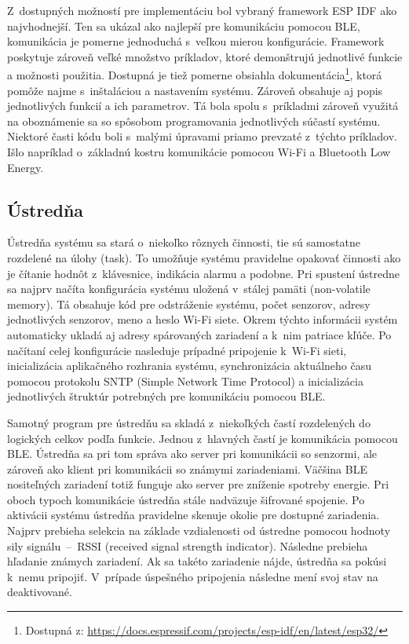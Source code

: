 Z~dostupných možností pre implementáciu bol vybraný framework ESP IDF ako najvhodnejší. Ten sa ukázal ako najlepší pre komunikáciu pomocou BLE, komunikácia je pomerne jednoduchá s~veľkou mierou konfigurácie. Framework poskytuje zároveň veľké množstvo príkladov, ktoré demonštrujú jednotlivé funkcie a možnosti použitia. Dostupná je tiež pomerne obsiahla dokumentácia\footnote{Dostupná z: \url{https://docs.espressif.com/projects/esp-idf/en/latest/esp32/}}, ktorá pomôže najme s~inštaláciou a nastavením systému. Zároveň obsahuje aj popis jednotlivých funkcií a ich parametrov. Tá bola spolu s~príkladmi zároveň využitá na oboznámenie sa so spôsobom programovania jednotlivých súčastí systému. Niektoré časti kódu boli s~malými úpravami priamo prevzaté z~týchto príkladov. Išlo napríklad o~základnú kostru komunikácie pomocou Wi-Fi a Bluetooth Low Energy.

\subsection{Ústredňa}

Ústredňa systému sa stará o~niekoľko rôznych činnosti, tie sú samostatne rozdelené na úlohy (task). To umožňuje systému pravidelne opakovať činnosti ako je čítanie hodnôt z~klávesnice, indikácia alarmu a podobne. Pri spustení ústredne sa najprv načíta konfigurácia systému uložená v~stálej pamäti (non-volatile memory). Tá obsahuje kód pre odstráženie systému, počet senzorov, adresy jednotlivých senzorov, meno a heslo Wi-Fi siete. Okrem týchto informácii systém automaticky ukladá aj adresy spárovaných zariadení a k~nim patriace kľúče. Po načítaní celej konfigurácie nasleduje prípadné pripojenie k~Wi-Fi sieti, inicializácia aplikačného rozhrania systému, synchronizácia aktuálneho času pomocou protokolu SNTP (Simple Network Time Protocol) a inicializácia jednotlivých štruktúr potrebných pre komunikáciu pomocou BLE. 

Samotný program pre ústredňu sa skladá z~niekoľkých častí rozdelených do logických celkov podľa funkcie. Jednou z~hlavných častí je komunikácia pomocou BLE. Ústredňa sa pri tom správa ako server pri komunikácii so senzormi, ale zároveň ako klient pri komunikácii so známymi zariadeniami. Väčšina BLE nositeľných zariadení totiž funguje ako server pre zníženie spotreby energie. Pri oboch typoch komunikácie ústredňa stále nadväzuje šifrované spojenie. Po aktivácii systému ústredňa pravidelne skenuje okolie pre dostupné zariadenia. Najprv prebieha selekcia na základe vzdialenosti od ústredne pomocou hodnoty sily signálu~--~RSSI (received signal strength indicator). Následne prebieha hľadanie známych zariadení. Ak sa takéto zariadenie nájde, ústredňa sa pokúsi k~nemu pripojiť. V~prípade úspešného pripojenia následne mení svoj stav na deaktivované.

